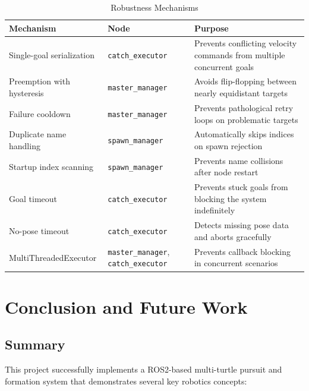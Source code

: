 \documentclass[12pt,a4paper]{article}
\begin{document}
\begin{table}[H]
\centering
\caption{Robustness Mechanisms}
\label{tab:robustness}
\begin{tabular}{p{3.5cm}p{4cm}p{6cm}}
\toprule
\textbf{Mechanism} & \textbf{Node} & \textbf{Purpose} \\
\midrule
Single-goal serialization & \texttt{catch\_executor} & Prevents conflicting velocity commands from multiple concurrent goals \\
Preemption with hysteresis & \texttt{master\_manager} & Avoids flip-flopping between nearly equidistant targets \\
Failure cooldown & \texttt{master\_manager} & Prevents pathological retry loops on problematic targets \\
Duplicate name handling & \texttt{spawn\_manager} & Automatically skips indices on spawn rejection \\
Startup index scanning & \texttt{spawn\_manager} & Prevents name collisions after node restart \\
Goal timeout & \texttt{catch\_executor} & Prevents stuck goals from blocking the system indefinitely \\
No-pose timeout & \texttt{catch\_executor} & Detects missing pose data and aborts gracefully \\
MultiThreadedExecutor & \texttt{master\_manager}, \texttt{catch\_executor} & Prevents callback blocking in concurrent scenarios \\
\bottomrule
\end{tabular}
\end{table}

\section{Conclusion and Future Work}
\label{sec:conclusion}

\subsection{Summary}

This project successfully implements a ROS2-based multi-turtle pursuit and formation system that demonstrates several key robotics concepts:
\end{document}
